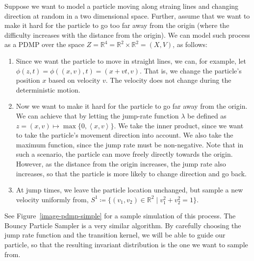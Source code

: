 \documentclass[report.tex]{subfiles}
\begin{document}
Suppose we want to model a particle moving along straing lines and changing
direction at random in a two dimensional space. Further, assume that we want to
make it hard for the particle to go too far away from the origin (where the difficulty
increases with the distance from the origin).
We can model such process as a PDMP over the space
$Z = \mathbb{R}^{4} = \mathbb{R}^{2} \times \mathbb{R}^{2} = (X, V)$,
as follows:
\begin{enumerate}
  \item Since we want the particle to move in straight lines, we can, for example,
    let $\phi(z, t) = \phi((x,v), t) = (x + vt, v)$. That is, we change the particle's
    position $x$ based on velocity $v$. The velocity does not change during the
    deterministic motion.
  \item Now we want to make it hard for the particle to go far away from the origin.
    We can achieve that by letting the jump-rate function $\lambda$ be defined as
    \mbox{$z = (x, v) \mapsto \max\{0, \left\langle x, v \right\rangle\}$}.
    We take the inner product, since we want to take the particle's movement
    direction into account. We also take the maximum function, since the jump rate
    must be non-negative. Note that in such a scenario,
    the particle can move freely directly towards the origin. However, as the
    distance from the origin increases, the jump rate also increases, so that the
    particle is more likely to change direction and go back.
  \item At jump times, we leave the particle location unchanged, but sample a new
    velocity uniformly from,
    $S^{1} \coloneqq \{(v_{1}, v_{2}) \in \mathbb{R}^{2} \mid v_{1}^{2} + v_{2}^2 = 1 \}$.
\end{enumerate}

See Figure~\ref{image-pdmp-simple} for a sample simulation of this process.
The Bouncy Particle Sampler is a very similar algorithm. By carefully choosing
the jump rate function and the transition kernel, we will be able to guide our
particle, so that the resulting invariant distribution is the one we want to sample from.
\end{document}
